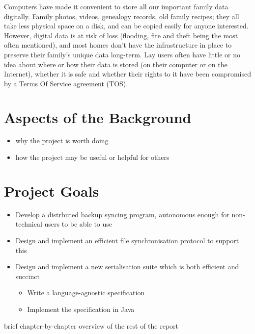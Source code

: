 \documentclass[12pt,a4paper,]{adreport}
\begin{document}
Computers have made it convenient to store all our important family data
digitally. Family photos, videos, genealogy records, old family recipes;
they all take less physical space on a disk, and can be copied easily
for anyone interested. However, digital data is at risk of loss
(flooding, fire and theft being the most often mentioned), and most
homes don't have the infrastructure in place to preserve their family's
unique data long-term. Lay users often have little or no idea about
where or how their data is stored (on their computer or on the
Internet), whether it is safe and whether their rights to it have been
compromised by a Terms Of Service agreement (TOS).

\section{Aspects of the Background}\label{aspects-of-the-background}

\begin{itemize}
\itemsep1pt\parskip0pt
\item
  why the project is worth doing
\item
  how the project may be useful or helpful for others
\end{itemize}

\section{Project Goals}\label{project-goals}

\begin{itemize}
\itemsep1pt\parskip0pt
\item
  Develop a distrbuted backup syncing program, autonomous enough for
  non-technical users to be able to use
\item
  Design and implement an efficient file synchronisation protocol to
  support this
\item
  Design and implement a new serialisation suite which is both efficient
  and succinct

  \begin{itemize}
  \itemsep1pt\parskip0pt
  \item
    Write a language-agnostic specification
  \item
    Implement the specification in Java
  \end{itemize}
\end{itemize}

brief chapter-by-chapter overview of the rest of the report
\end{document}
